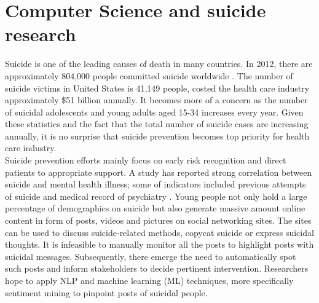 \section{Computer Science and suicide research}
Suicide is one of the leading causes of death in many countries. In 2012, there are approximately 804,000 people committed suicide worldwide \cite{WorldHealthOrganization2014}. The number of suicide victims in United States is 41,149 people, costed the health care industry approximately \$51 billion annually\cite{CentersforDiseaseControlandPreventionCDC2013}. It becomes more of a concern as the number of suicidal adolescents and young adults aged 15-34 increases every year. Given these statistics and the fact that the total number of suicide cases are increasing annually, it is no surprise that suicide prevention becomes top priority for health care industry.\\
Suicide prevention efforts mainly focus on early risk recognition and direct patients to appropriate support. A study has reported strong correlation between suicide and mental health illness; some of indicators included previous attempts of suicide and medical record of psychiatry \cite{Harris1997}. Young people not only hold a large percentage of demographics on suicide but also generate massive amount online content in form of posts, videos and pictures on social networking sites. The sites can be used to discuss suicide-related methods, copycat suicide or express suicidal thoughts. It is infeasible to manually monitor all the posts to highlight posts with suicidal messages. Subsequently, there emerge the need to automatically spot such posts and inform stakeholders to decide pertinent intervention. Researchers hope to apply NLP and machine learning (ML) techniques, more specifically sentiment mining to pinpoint posts of suicidal people. 
